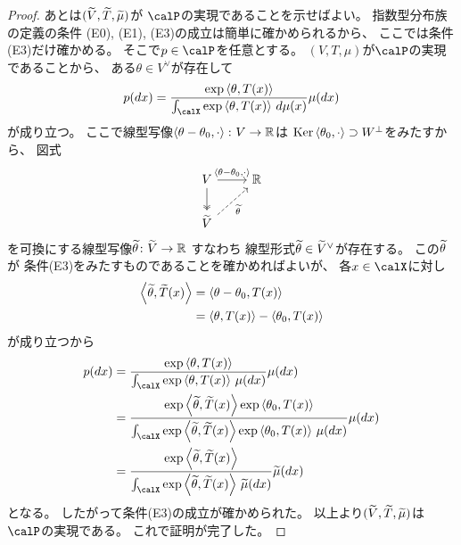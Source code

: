 \documentclass[report]{jlreq}
\begin{document}
\begin{proof}
    あとは$(\widetilde{V}, \widetilde{T}, \widetilde{\mu})$が
    $\calP$の実現であることを示せばよい。
    指数型分布族の定義の条件
    (E0), (E1), (E3)の成立は簡単に確かめられるから、
    ここでは条件(E3)だけ確かめる。
    そこで$p \in \calP$を任意とする。
    $(V, T, \mu)$が$\calP$の実現であることから、
    ある$\theta \in V^\vee$が存在して
    \begin{equation}
        p(dx) =
            \frac{
                \exp\myangle{\theta}{T(x)}
            }{
                \int_\calX \exp\myangle{\theta}{T(x)} \, d\mu(x)
            }
            \mu(dx)
    \end{equation}
    が成り立つ。
    ここで線型写像$\left\langle{\theta - \theta_0},{\cdot}\right\rangle \colon V \to \mathbb{R}$は
    $\operatorname{\mathrm{Ker}} \left\langle{\theta_0},{\cdot}\right\rangle \supset W^\perp$をみたすから、
    図式
    \begin{equation}
        \begin{tikzcd}
            V
                \ar[two heads]{d}
                \ar{r}{\myangle{\theta - \theta_0}{\cdot}}
                & \R
                \\
            \wt{V}
                \ar[dashed]{ru}[swap]{\wt{\theta}}
        \end{tikzcd}
    \end{equation}
    を可換にする線型写像$\widetilde{\theta} \colon \widetilde{V} \to \mathbb{R}$
    すなわち
    線型形式$\widetilde{\theta} \in \widetilde{V}^\vee$が存在する。
    この$\widetilde{\theta}$が
    条件(E3)をみたすものであることを確かめればよいが、
    各$x \in \calX$に対し
    \begin{alignat}{1}
        \left\langle{\widetilde{\theta}},{\widetilde{T}(x)}\right\rangle
            &=
                \left\langle{\theta - \theta_0},{T(x)}\right\rangle
                \\
            &=
                \left\langle{\theta},{T(x)}\right\rangle
                -
                \left\langle{\theta_0},{T(x)}\right\rangle
    \end{alignat}
    が成り立つから
    \begin{alignat}{1}
        p(dx)
            &=
                \frac{
                    \exp\myangle{\theta}{T(x)}
                }{
                    \int_\calX
                    \exp\myangle{\theta}{T(x)}
                    \, \mu(dx)
                }
                \mu(dx)
                \\
            &=
                \frac{
                    \exp\myangle{\wt{\theta}}{\wt{T}(x)}
                    \exp\myangle{\theta_0}{T(x)}
                }{
                    \int_\calX 
                    \exp\myangle{\wt{\theta}}{\wt{T}(x)}
                    \exp\myangle{\theta_0}{T(x)}
                    \, \mu(dx)
                }
                \mu(dx)
                \\
            &=
                \frac{
                    \exp\myangle{\wt{\theta}}{\wt{T}(x)}
                }{
                    \int_\calX
                    \exp\myangle{\wt{\theta}}{\wt{T}(x)}
                    \, \wt{\mu}(dx)
                }
                \wt{\mu}(dx)
    \end{alignat}
    となる。
    したがって条件(E3)の成立が確かめられた。
    以上より$(\widetilde{V}, \widetilde{T}, \widetilde{\mu})$は$\calP$の実現である。
    これで証明が完了した。
\end{proof}
\end{document}
